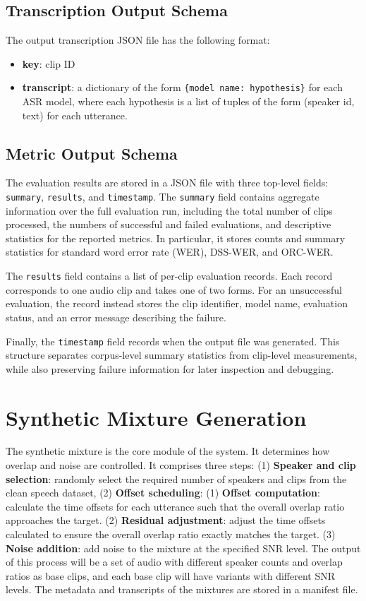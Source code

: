 \subsection{Transcription Output Schema}
The output transcription JSON file has the following format:
\begin{itemize}
    \item \textbf{key}: clip ID
    \item \textbf{transcript}: a dictionary of the form \texttt{\{model name: hypothesis\}} for each ASR model, where each hypothesis is a list of tuples of the form (speaker id, text) for each utterance.
\end{itemize}

\subsection{Metric Output Schema}

The evaluation results are stored in a JSON file with three top-level fields: \texttt{summary}, \texttt{results}, and \texttt{timestamp}. 
The \texttt{summary} field contains aggregate information over the full evaluation run, including the total number of clips processed, the numbers of successful and failed evaluations, and descriptive statistics for the reported metrics. 
In particular, it stores counts and summary statistics for standard word error rate (WER), DSS-WER, and ORC-WER.

The \texttt{results} field contains a list of per-clip evaluation records. Each record corresponds to one audio clip and takes one of two forms. For an unsuccessful evaluation, the record instead stores the clip identifier, model name, evaluation status, and an error message describing the failure. 

Finally, the \texttt{timestamp} field records when the output file was generated. 
This structure separates corpus-level summary statistics from clip-level measurements, while also preserving failure information for later inspection and debugging.


\section{Synthetic Mixture Generation}
The synthetic mixture is the core module of the system. It determines how overlap and noise are controlled. It comprises three steps: (1) \textbf{Speaker and clip selection}: randomly select the required number of speakers and clips from the clean speech dataset, (2) \textbf{Offset scheduling}:
(1) \textbf{Offset computation}: calculate the time offsets for each utterance such that the overall overlap ratio approaches the target. (2) \textbf {Residual adjustment}: adjust the time offsets calculated to ensure the overall overlap ratio exactly matches the target. (3) \textbf{Noise addition}: add noise to the mixture at the specified SNR level. The output of this process will be a set of audio with different speaker counts and overlap ratios as base clips, and each base clip will have variants with different SNR levels. The metadata and transcripts of the mixtures are stored in a manifest file.

